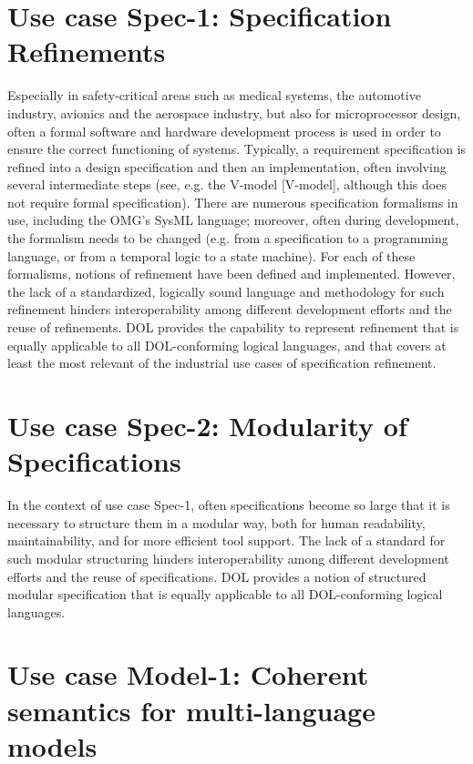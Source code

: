 \documentclass[10pt,%
\ifpretendfinal
final%
\else
draft%
\fi,
]{scrreprt}
\begin{document}
\section{Use case Spec-1: Specification Refinements}
Especially in safety-critical areas such as medical systems, the automotive industry, avionics and the aerospace industry, but also for microprocessor design, often 
a formal software and hardware development process is used in order to ensure the correct functioning of systems. Typically, a requirement specification is refined 
into a design specification and then an implementation, often involving several intermediate steps (see, e.g. the V-model [V-model], although this does not require 
formal specification).
There are numerous specification formalisms in use, including the OMG's SysML language; moreover, often during development, the formalism needs to be 
changed (e.g. from a specification to a programming language, or from a temporal logic to a state machine). For each of these formalisms, notions of refinement 
have been defined and implemented. However, the lack of a standardized, logically sound language and methodology for such refinement hinders interoperability 
among different development efforts and the reuse of refinements.
DOL  provides the capability to represent refinement that is equally applicable to all DOL-conforming logical languages, and that  
covers at least the most relevant of the industrial use cases of specification refinement.

\section{Use case Spec-2: Modularity of Specifications}
In the context of use case Spec-1, often specifications become so large that it is necessary to structure them in a modular way, both for human readability, 
maintainability, and for more efficient tool support. The lack of a standard for such modular structuring hinders interoperability among different development efforts 
and the reuse of specifications.
DOL  provides a notion of structured modular specification that is equally applicable to all DOL-conforming logical languages.
	
\section{Use case Model-1: Coherent semantics for multi-language models}
	
\end{document}
